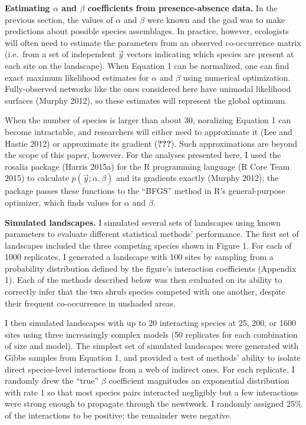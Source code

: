 \documentclass[12pt,]{article}
\begin{document}
\begin{spacing}{1.9}
\begin{flushleft}
\noindent \textbf{Estimating $\alpha$ and $\beta$ coefficients from presence-absence data.}
In the previous section, the values of \(\alpha\) and \(\beta\) were
known and the goal was to make predictions about possible species
assemblages. In practice, however, ecologists will often need to
estimate the parameters from an observed co-occurrence matrix (i.e.~from
a set of independent \(\vec{y}\) vectors indicating which species are
present at each site on the landscape). When Equation 1 can be
normalized, one can find exact maximum likelihood estimates for
\(\alpha\) and \(\beta\) using numerical optimization. Fully-observed
networks like the ones considered here have unimodal likelihood surfaces
(Murphy 2012), so these estimates will represent the global optimum.

When the number of species is larger than about 30, noralizing Equation
1 can become intractable, and researchers will either need to
approximate it (Lee and Hastie 2012) or approximate its gradient
({\textbf{???}}). Such approximations are beyond the scope of this
paper, however. For the analyses presented here, I used the rosalia
package (Harris 2015a) for the R programming language (R Core Team 2015)
to calculate \(p(\vec{y}; \alpha, \beta)\) and its gradients exactly
(Murphy 2012); the package passes these functions to the ``BFGS'' method
in R's general-purpose optimizer, which finds values for \(\alpha\) and
\(\beta\).

\noindent \textbf{Simulated landscapes.} I simulated several sets of
landscapes using known parameters to evaluate different statistical
methods' performance. The first set of landscapes included the three
competing species shown in Figure 1. For each of 1000 replicates, I
generated a landscape with 100 sites by sampling from a probability
distribution defined by the figure's interaction coefficients (Appendix
1). Each of the methods described below was then evaluated on its
ability to correctly infer that the two shrub species competed with one
another, despite their frequent co-occurrence in unshaded areas.

I then simulated landscapes with up to 20 interacting species at 25,
200, or 1600 sites using three increasingly complex models (50
replicates for each combination of size and model). The simplest set of
simulated landscapes were generated with Gibbs samples from Equation 1,
and provided a test of methods' ability to isolate direct species-level
interactions from a web of indirect ones. For each replicate, I randomly
drew the ``true'' \(\beta\) coefficient magnitudes an exponential
distribution with rate 1 so that most species pairs interacted
negligibly but a few interactions were strong enough to propagate
through the newtwork. I randomly assigned 25\% of the interactions to be
positive; the remainder were negative.


\end{flushleft}
\end{spacing}
\end{document}
